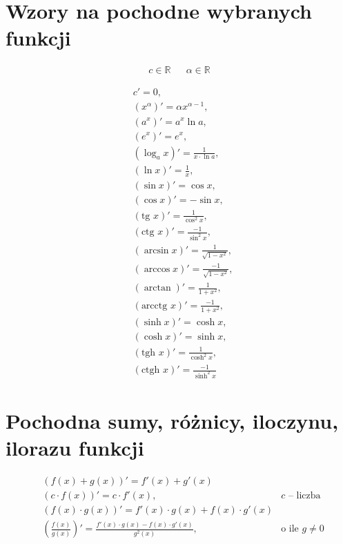 \documentclass[11pt]{article}
\author{Rafał Grot}
\date{\today}
\title{}
\begin{document}
\section{Wzory na pochodne wybranych funkcji}
\label{sec:orga8ed568}

\begin{align*}
c \in \mathbb{R} && \alpha \in \mathbb{R}
\end{align*}

\begin{align}
  & c' = 0,\\
  & \left( x^\alpha \right)' = \alpha x^{\alpha - 1},\\
  & \left( a^{x} \right)' = a^{x} \ln a ,\\
  & \left( e^{x} \right)' = e^{x},\\
  & \left( \log_{a}x \right)'= \frac{1}{x \cdot \ln a},\\
  & \left( \ln x \right)' = \frac{1}{x},\\
  & \left( \sin x \right)' = \cos x,\\
  & \left( \cos x \right)' = - \sin x,\\
  & \left( \text{tg } x \right)' = \frac{1}{\cos^{2} x},\\
  & \left( \text{ctg } x  \right)' = \frac{-1}{\sin^{2} x},\\
  & \left( \arcsin x \right)' = \frac{1}{\sqrt{1-x^{2}}},\\
  & \left( \arccos x \right)' = \frac{-1}{\sqrt{1-x^{2}}},\\
  & \left( \arctan \right)' = \frac{1}{1+x^{2}},\\
  & \left( \text{arcctg } x \right)' = \frac{-1}{1+x^{2}},\\
  & \left( \sinh x \right)' = \cosh x,\\
  & \left( \cosh x \right)' = \sinh x,\\
  & \left( \text{tgh } x \right)' = \frac{ 1 }{ \cosh^{2} x},\\
  & \left( \text{ctgh } x \right)' = \frac{-1}{ \sinh^{2} x}
\end{align}
\section{Pochodna sumy, różnicy, iloczynu, ilorazu funkcji}
\label{sec:orga963977}

\begin{align}
  & \left( f(x) + g(x) \right)' = f'(x) + g'(x)\\
  & \left( c \cdot f(x) \right) ' = c \cdot f'(x),& c \text{ -- liczba }\\
  & \left( f(x) \cdot g(x) \right) ' = f'(x) \cdot g(x) + f(x) \cdot g'(x)\\
  & \left( \frac{f(x)}{g(x)} \right) ' = \frac{f'(x) \cdot g(x) - f(x) \cdot g'(x)}{g^{2}(x)}, & \text{o ile } g \neq 0\\
\end{align}
\end{document}

